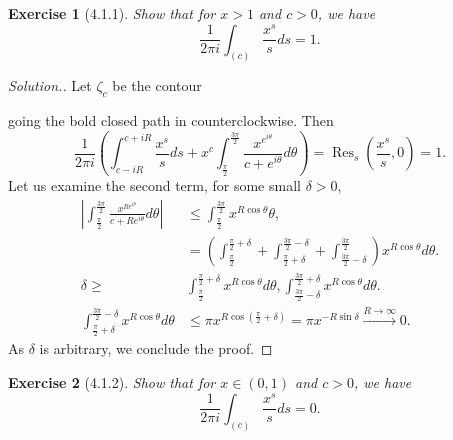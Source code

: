 \documentclass{article}
\newtheorem{exercise}{Exercise}[section]
\DeclareMathOperator{\Res}{Res}
\begin{document}
\begin{exercise}[4.1.1]
  Show that for $x>1$ and $c>0$, we have
  \begin{equation*}
    {\frac 1 {2\pi i}}\int_{(c)}{\frac {x^s} s}ds = 1.
  \end{equation*}
\end{exercise}
\begin{proof}[Solution.]
  Let $\zeta_c$ be the contour 
  \begin{center}
\end{center}
going the bold closed path in counterclockwise.  Then 
\begin{equation*}
  {\frac 1 {2\pi i}}\left(\int_{c-iR}^{c+iR}{\frac {x^s} s}ds+x^c\int_{{\frac {\pi} 2}}^{{\frac {3\pi} 2}} {\frac {x^{e^{i\theta}}} {c+e^{i\theta}}}d\theta\right) = \Res_s\left({\frac {x^s} s},0\right) = 1.
\end{equation*}
Let us examine the second term, for some small $\delta>0$,
\begin{align*}
  \left\vert\int_{{\frac {\pi} 2}}^{{\frac {3\pi} 2}}{\frac {x^{Re^{i\theta}}} {c+Re^{i\theta}}}d\theta\right\vert&\leq \int_{{\frac {\pi} 2}}^{{\frac {3\pi} 2}}x^{R\cos\theta}\theta,\\
  & = \left(\int_{{\frac {\pi} 2}}^{{\frac {\pi} 2}+\delta}+\int_{{\frac {\pi} 2}+\delta}^{{\frac {3\pi} 2}-\delta}+\int_{{\frac {3\pi} 2}-\delta}^{{\frac {3\pi} 2}}\right)x^{R\cos\theta}d\theta.\\
  \delta\geq&\int_{{\frac {\pi} 2}}^{{\frac {\pi} 2}+\delta}x^{R\cos\theta}d\theta,\int_{{\frac {3\pi} 2}-\delta}^{{\frac {3\pi} 2}+\delta}x^{R\cos\theta}d\theta.\\
  \int_{{\frac {\pi} 2}+\delta}^{{\frac {3\pi} 2}-\delta}x^{R\cos\theta}d\theta&\leq \pi x^{R\cos\left({\frac \pi 2}+\delta\right)} = \pi x^{-R\sin\delta}\stackrel{R\to\infty}{\to}0.
\end{align*}
As $\delta$ is arbitrary, we conclude the proof.
\end{proof}
\begin{exercise}[4.1.2]
  Show that for $x\in(0,1)$ and $c>0$, we have
  \begin{equation*}
    {\frac 1 {2\pi i}}\int_{(c)}{\frac {x^s} s}ds = 0.
  \end{equation*}
\end{exercise}
\end{document}
